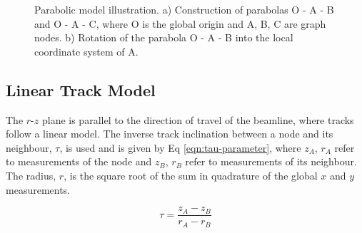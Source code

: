 \begin{figure}[htbp!] 
    \centering
    \hfill%
    \caption{Parabolic model illustration. a) Construction of parabolas O - A - B and O - A - C, where O is the global origin and A, B, C are graph nodes. b) Rotation of the parabola O - A - B into the local coordinate system of A.}
    \label{fig:gnn-parabolic-model}
\end{figure}


\subsection{Linear Track Model}
\label{linear-state}

The $r$-$z$ plane is parallel to the direction of travel of the beamline, where tracks follow a linear model. The inverse track inclination between a node and its neighbour, $\tau$, is used and is given by Eq \eqref{eqn:tau-parameter}, where $z_A$, $r_A$ refer to measurements of the node and $z_B$, $r_B$ refer to measurements of its neighbour. The radius, $r$, is the square root of the sum in quadrature of the global $x$ and $y$ measurements.

\begin{equation}
\tau = \frac{z_A - z_B}{r_A - r_B}
\label{eqn:tau-parameter}
\end{equation}

